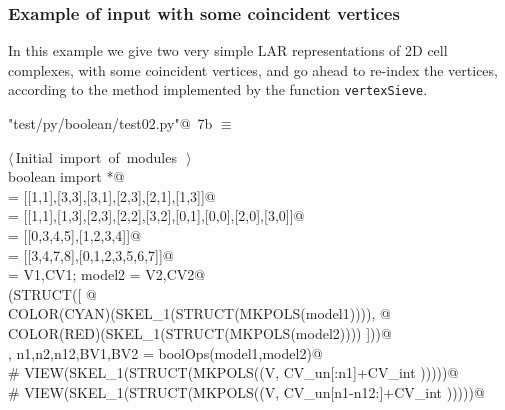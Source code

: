 \documentclass[11pt,oneside]{article}	%
\begin{document}
\subsubsection{Example of input with some coincident vertices}
In this example we give two very simple LAR representations of 2D cell complexes, with some coincident vertices, and go ahead to re-index the vertices, according to the method implemented by the function \texttt{vertexSieve}.

\begin{flushleft} \small
\begin{minipage}{\linewidth} \label{scrap9}
\protect{}\verb@"test/py/boolean/test02.py"@\nobreak\ {\footnotesize 7b }$\equiv$
\vspace{-1ex}
\begin{list}{}{} \item
\mbox{}\verb@@\hbox{$\langle\,$Initial import of modules\nobreak\ {\footnotesize {}}$\,\rangle$}\verb@@\\
\mbox{}\verb@from boolean import *@\\
\mbox{} = [[1,1],[3,3],[3,1],[2,3],[2,1],[1,3]]@\\
\mbox{} = [[1,1],[1,3],[2,3],[2,2],[3,2],[0,1],[0,0],[2,0],[3,0]]@\\
\mbox{} = [[0,3,4,5],[1,2,3,4]]@\\
\mbox{} = [[3,4,7,8],[0,1,2,3,5,6,7]]@\\
\mbox{} = V1,CV1; model2 = V2,CV2@\\
\mbox{}\verb@VIEW(STRUCT([ @\\
\mbox{}\verb@   COLOR(CYAN)(SKEL_1(STRUCT(MKPOLS(model1)))), @\\
\mbox{}\verb@   COLOR(RED)(SKEL_1(STRUCT(MKPOLS(model2)))) ]))@\\
\mbox{}\verb@V, n1,n2,n12,BV1,BV2 = boolOps(model1,model2)@\\
\mbox{}\verb@# VIEW(SKEL_1(STRUCT(MKPOLS((V, CV_un[:n1]+CV_int )))))@\\
\mbox{}\verb@# VIEW(SKEL_1(STRUCT(MKPOLS((V, CV_un[n1-n12:]+CV_int )))))@\\
\mbox{}\verb@@{\NWsep}
\end{list}
\vspace{-2ex}
\end{minipage}\\[4ex]
\end{flushleft}
\end{document}
